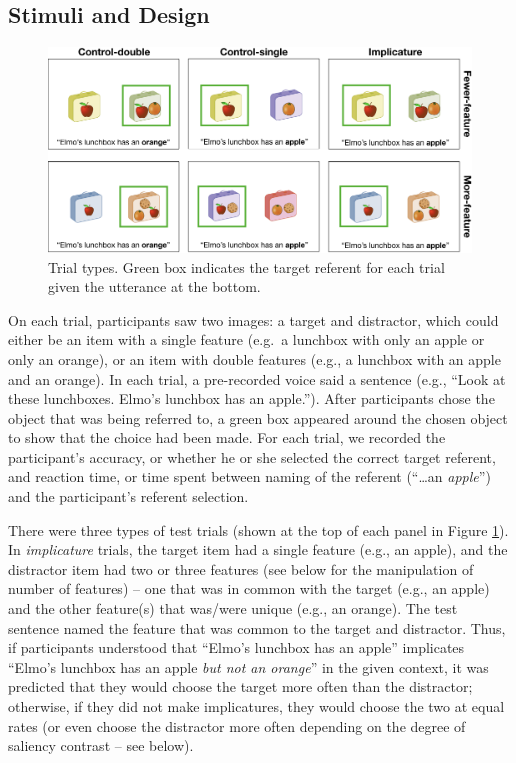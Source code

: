 \documentclass[man]{apa6}
\theoremstyle{definition}
\theoremstyle{definition}
\theoremstyle{definition}
\theoremstyle{remark}
\begin{document}
\subsection{Stimuli and Design}\label{stimuli-and-design}

\begin{figure}
\includegraphics[width=5.98in]{figs/stimuli} \caption{Trial types. Green box indicates the target referent for each trial given the utterance at the bottom.}\label{fig:stimuli}
\end{figure}

On each trial, participants saw two images: a target and distractor,
which could either be an item with a single feature (e.g.~a lunchbox
with only an apple or only an orange), or an item with double features
(e.g., a lunchbox with an apple and an orange). In each trial, a
pre-recorded voice said a sentence (e.g., \enquote{Look at these
lunchboxes. Elmo's lunchbox has an apple.}). After participants chose
the object that was being referred to, a green box appeared around the
chosen object to show that the choice had been made. For each trial, we
recorded the participant's accuracy, or whether he or she selected the
correct target referent, and reaction time, or time spent between naming
of the referent (\enquote{\ldots{}an \emph{apple}}) and the
participant's referent selection.

There were three types of test trials (shown at the top of each panel in
Figure \ref{fig:stimuli}). In \emph{implicature} trials, the target item
had a single feature (e.g., an apple), and the distractor item had two
or three features (see below for the manipulation of number of features)
-- one that was in common with the target (e.g., an apple) and the other
feature(s) that was/were unique (e.g., an orange). The test sentence
named the feature that was common to the target and distractor. Thus, if
participants understood that \enquote{Elmo's lunchbox has an apple}
implicates \enquote{Elmo's lunchbox has an apple \emph{but not an
orange}} in the given context, it was predicted that they would choose
the target more often than the distractor; otherwise, if they did not
make implicatures, they would choose the two at equal rates (or even
choose the distractor more often depending on the degree of saliency
contrast -- see below).
\end{document}

